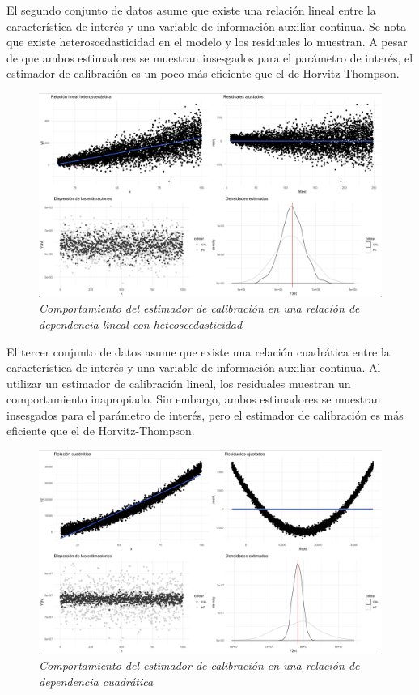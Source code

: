 \documentclass[
  12pt,
  spanish,
]{book}
\begin{document}
El segundo conjunto de datos asume que existe una relación lineal entre la característica de interés y una variable de información auxiliar continua. Se nota que existe heteroscedasticidad en el modelo y los residuales lo muestran. A pesar de que ambos estimadores se muestran insesgados para el parámetro de interés, el estimador de calibración es un poco más eficiente que el de Horvitz-Thompson.

\begin{figure}
\centering
\includegraphics{Pics/c6.png}
\caption{\emph{Comportamiento del estimador de calibración en una relación de dependencia lineal con heteoscedasticidad}}
\end{figure}

El tercer conjunto de datos asume que existe una relación cuadrática entre la característica de interés y una variable de información auxiliar continua. Al utilizar un estimador de calibración lineal, los residuales muestran un comportamiento inapropiado. Sin embargo, ambos estimadores se muestran insesgados para el parámetro de interés, pero el estimador de calibración es más eficiente que el de Horvitz-Thompson.

\begin{figure}
\centering
\includegraphics{Pics/c7.png}
\caption{\emph{Comportamiento del estimador de calibración en una relación de dependencia cuadrática}}
\end{figure}
\end{document}
